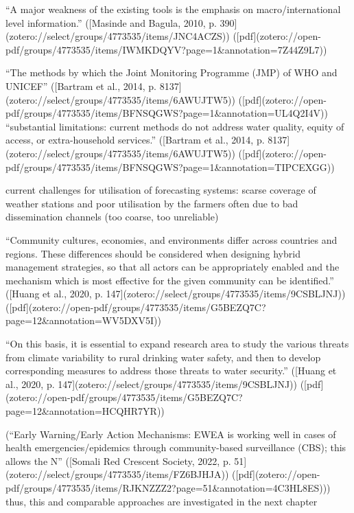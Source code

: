 “A major weakness of the existing tools is the emphasis on macro/international level information.” ([Masinde and Bagula, 2010, p. 390](zotero://select/groups/4773535/items/JNC4ACZS)) ([pdf](zotero://open-pdf/groups/4773535/items/IWMKDQYV?page=1&annotation=7Z44Z9L7))

“The methods by which the Joint Monitoring Programme (JMP) of WHO and UNICEF” ([Bartram et al., 2014, p. 8137](zotero://select/groups/4773535/items/6AWUJTW5)) ([pdf](zotero://open-pdf/groups/4773535/items/BFNSQGWS?page=1&annotation=UL4Q2I4V))
“substantial limitations: current methods do not address water quality, equity of access, or extra-household services.” ([Bartram et al., 2014, p. 8137](zotero://select/groups/4773535/items/6AWUJTW5)) ([pdf](zotero://open-pdf/groups/4773535/items/BFNSQGWS?page=1&annotation=TIPCEXGG))

current challenges for utilisation of forecasting systems: scarse coverage of weather stations and poor utilisation by the farmers often due to bad dissemination channels  (too coarse, too unreliable)

“Community cultures, economies, and environments differ across countries and regions. These differences should be considered when designing hybrid management strategies, so that all actors can be appropriately enabled and the mechanism which is most effective for the given community can be identified.” ([Huang et al., 2020, p. 147](zotero://select/groups/4773535/items/9CSBLJNJ)) ([pdf](zotero://open-pdf/groups/4773535/items/G5BEZQ7C?page=12&annotation=WV5DXV5I))

“On this basis, it is essential to expand research area to study the various threats from climate variability to rural drinking water safety, and then to develop corresponding measures to address those threats to water security.” ([Huang et al., 2020, p. 147](zotero://select/groups/4773535/items/9CSBLJNJ)) ([pdf](zotero://open-pdf/groups/4773535/items/G5BEZQ7C?page=12&annotation=HCQHR7YR))

(“Early Warning/Early Action Mechanisms: EWEA is working well in cases of health emergencies/epidemics through community-based surveillance (CBS); this allows the N” ([Somali Red Crescent Society, 2022, p. 51](zotero://select/groups/4773535/items/FZ6BJHJA)) ([pdf](zotero://open-pdf/groups/4773535/items/RJKNZZZ2?page=51&annotation=4C3HL8ES))) 
thus, this and comparable approaches are investigated in the next chapter

